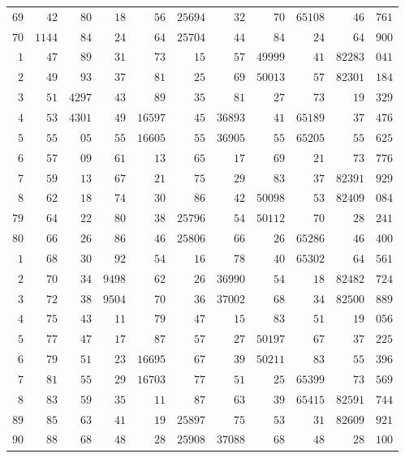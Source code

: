 \begin{longtable}{@{}r|r|r|r|r|r|r|r|r|r|r@{}}
$69$ & $42$ & $80$ & $18$ & $56$ & $25694$ & $32$ & $70$ & $65108$ & $46$ & $761$\\
$70$ & $1144$ & $84$ & $24$ & $64$ & $25704$ & $44$ & $84$ & $24$ & $64$ & $900$\\
$1$ & $47$ & $89$ & $31$ & $73$ & $15$ & $57$ & $49999$ & $41$ & $82283$ & $041$\\
$2$ & $49$ & $93$ & $37$ & $81$ & $25$ & $69$ & $50013$ & $57$ & $82301$ & $184$\\
$3$ & $51$ & $4297$ & $43$ & $89$ & $35$ & $81$ & $27$ & $73$ & $19$ & $329$\\
$4$ & $53$ & $4301$ & $49$ & $16597$ & $45$ & $36893$ & $41$ & $65189$ & $37$ & $476$\\
$5$ & $55$ & $05$ & $55$ & $16605$ & $55$ & $36905$ & $55$ & $65205$ & $55$ & $625$\\
$6$ & $57$ & $09$ & $61$ & $13$ & $65$ & $17$ & $69$ & $21$ & $73$ & $776$\\
$7$ & $59$ & $13$ & $67$ & $21$ & $75$ & $29$ & $83$ & $37$ & $82391$ & $929$\\
$8$ & $62$ & $18$ & $74$ & $30$ & $86$ & $42$ & $50098$ & $53$ & $82409$ & $084$\\
$79$ & $64$ & $22$ & $80$ & $38$ & $25796$ & $54$ & $50112$ & $70$ & $28$ & $241$\\
$80$ & $66$ & $26$ & $86$ & $46$ & $25806$ & $66$ & $26$ & $65286$ & $46$ & $400$\\
$1$ & $68$ & $30$ & $92$ & $54$ & $16$ & $78$ & $40$ & $65302$ & $64$ & $561$\\
$2$ & $70$ & $34$ & $9498$ & $62$ & $26$ & $36990$ & $54$ & $18$ & $82482$ & $724$\\
$3$ & $72$ & $38$ & $9504$ & $70$ & $36$ & $37002$ & $68$ & $34$ & $82500$ & $889$\\
$4$ & $75$ & $43$ & $11$ & $79$ & $47$ & $15$ & $83$ & $51$ & $19$ & $056$\\
$5$ & $77$ & $47$ & $17$ & $87$ & $57$ & $27$ & $50197$ & $67$ & $37$ & $225$\\
$6$ & $79$ & $51$ & $23$ & $16695$ & $67$ & $39$ & $50211$ & $83$ & $55$ & $396$\\
$7$ & $81$ & $55$ & $29$ & $16703$ & $77$ & $51$ & $25$ & $65399$ & $73$ & $569$\\
$8$ & $83$ & $59$ & $35$ & $11$ & $87$ & $63$ & $39$ & $65415$ & $82591$ & $744$\\
$89$ & $85$ & $63$ & $41$ & $19$ & $25897$ & $75$ & $53$ & $31$ & $82609$ & $921$\\
$90$ & $88$ & $68$ & $48$ & $28$ & $25908$ & $37088$ & $68$ & $48$ & $28$ & $100$\\

\end{longtable}

